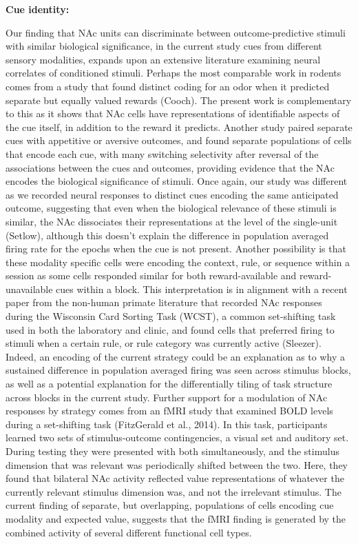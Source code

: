 \documentclass[11pt]{article}
\begin{document}
{\bf Cue identity:}

Our finding that NAc units can discriminate between outcome-predictive stimuli with similar biological significance, in the current study cues from different sensory modalities, expands upon an extensive literature examining neural correlates of conditioned stimuli. Perhaps the most comparable work in rodents comes from a study that found distinct coding for an odor when it predicted separate but equally valued rewards (Cooch). The present work is complementary to this as it shows that NAc cells have representations of identifiable aspects of the cue itself, in addition to the reward it predicts. Another study paired separate cues with appetitive or aversive outcomes, and found separate populations of cells that encode each cue, with many switching selectivity after reversal of the associations between the cues and outcomes, providing evidence that the NAc encodes the biological significance of stimuli. Once again, our study was different as we recorded neural responses to distinct cues encoding the same anticipated outcome, suggesting that even when the biological relevance of these stimuli is similar, the NAc dissociates their representations at the level of the single-unit (Setlow), although this doesn’t explain the difference in population averaged firing rate for the epochs when the cue is not present. Another possibility is that these modality specific cells were encoding the context, rule, or sequence within a session as some cells responded similar for both reward-available and reward-unavailable cues within a block. This interpretation is in alignment with a recent paper from the non-human primate literature that recorded NAc responses during the Wisconsin Card Sorting Task (WCST), a common set-shifting task used in both the laboratory and clinic, and found cells that preferred firing to stimuli when a certain rule, or rule category was currently active (Sleezer). Indeed, an encoding of the current strategy could be an explanation as to why a sustained difference in population averaged firing was seen across stimulus blocks, as well as a potential explanation for the differentially tiling of task structure across blocks in the current study. Further support for a modulation of NAc responses by strategy comes from an fMRI study that examined BOLD levels during a set-shifting task (FitzGerald et al., 2014). In this task, participants learned two sets of stimulus-outcome contingencies, a visual set and auditory set. During testing they were presented with both simultaneously, and the stimulus dimension that was relevant was periodically shifted between the two. Here, they found that bilateral NAc activity reflected value representations of whatever the currently relevant stimulus dimension was, and not the irrelevant stimulus. The current finding of separate, but overlapping, populations of cells encoding cue modality and expected value, suggests that the fMRI finding is generated by the combined activity of several different functional cell types.
\end{document}
